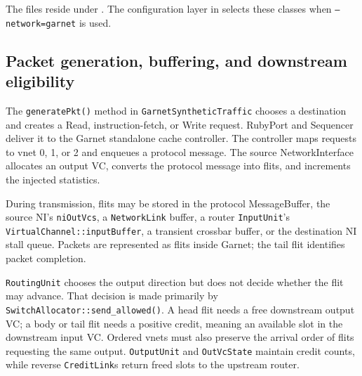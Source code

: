 \documentclass[11pt,a4paper]{article}
\newcommand{\code}[1]{\texttt{#1}}
\begin{document}
\noindent The files reside under
. The configuration layer in
 selects these classes when
\code{--network=garnet} is used.

\subsection{Packet generation, buffering, and downstream eligibility}

\begin{center}
\end{center}

The \code{generatePkt()} method in \code{GarnetSyntheticTraffic} chooses a destination and creates
a Read, instruction-fetch, or Write request. RubyPort and Sequencer deliver it
to the Garnet standalone cache controller. The controller maps requests to
vnet 0, 1, or 2 and enqueues a protocol message. The source NetworkInterface
allocates an output VC, converts the protocol message into flits, and increments
the injected statistics.

During transmission, flits may be stored in the protocol MessageBuffer, the
source NI's \code{niOutVcs}, a \code{NetworkLink} buffer, a router
\code{InputUnit}'s \code{VirtualChannel::inputBuffer}, a transient crossbar
buffer, or the destination NI stall queue. Packets are represented as flits
inside Garnet; the tail flit identifies packet completion.

\code{RoutingUnit} chooses the output direction but does not decide whether
the flit may advance. That decision is made primarily by
\code{SwitchAllocator::send\_allowed()}. A head flit needs a free downstream
output VC; a body or tail flit needs a positive credit, meaning an available
slot in the downstream input VC. Ordered vnets must also preserve the arrival
order of flits requesting the same output. \code{OutputUnit} and
\code{OutVcState} maintain credit counts, while reverse \code{CreditLink}s
return freed slots to the upstream router.
\end{document}
